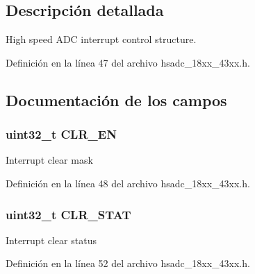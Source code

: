 \subsection{Descripción detallada}
High speed A\+DC interrupt control structure. 

Definición en la línea 47 del archivo hsadc\+\_\+18xx\+\_\+43xx.\+h.



\subsection{Documentación de los campos}
\subsubsection[{\texorpdfstring{C\+L\+R\+\_\+\+EN}{CLR_EN}}]{ uint32\+\_\+t C\+L\+R\+\_\+\+EN}\hypertarget{struct_h_s_a_d_c_i_n_t_c_t_r_l___t_a0d317a6488644b87e17e5f559c08289f}{}\label{struct_h_s_a_d_c_i_n_t_c_t_r_l___t_a0d317a6488644b87e17e5f559c08289f}
Interrupt clear mask 

Definición en la línea 48 del archivo hsadc\+\_\+18xx\+\_\+43xx.\+h.

\subsubsection[{\texorpdfstring{C\+L\+R\+\_\+\+S\+T\+AT}{CLR_STAT}}]{ uint32\+\_\+t C\+L\+R\+\_\+\+S\+T\+AT}\hypertarget{struct_h_s_a_d_c_i_n_t_c_t_r_l___t_a2736f94695ea3082afc55537cc4172b4}{}\label{struct_h_s_a_d_c_i_n_t_c_t_r_l___t_a2736f94695ea3082afc55537cc4172b4}
Interrupt clear status 

Definición en la línea 52 del archivo hsadc\+\_\+18xx\+\_\+43xx.\+h.

